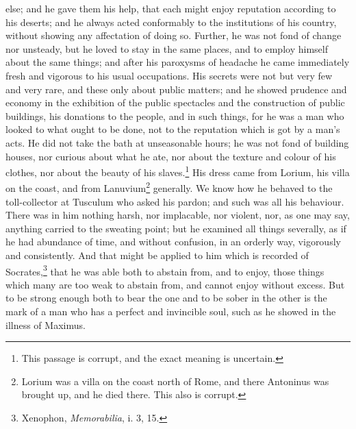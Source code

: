 \begin{enumerate}
else; and he gave them his help, that each might enjoy reputation according to his deserts; and he always acted conformably to the institutions of his country, without showing any affectation of doing so. Further, he was not fond of change nor unsteady, but he loved to stay in the same places, and to employ himself about the same things; and after his paroxysms of headache he came immediately fresh and vigorous to his usual occupations. His secrets were not but very few and very rare, and these only about public matters; and he showed prudence and economy in the exhibition of the public spectacles and the construction of public buildings, his donations to the people, and in such things, for he was a man who looked to what ought to be done, not to the reputation which is got by a man's acts. He did not take the bath at unseasonable hours; he was not fond of building houses, nor curious about what he ate, nor about the texture and colour of his clothes, nor about the beauty of his slaves.\footnote{This passage is corrupt, and the exact meaning is uncertain.} His dress came from Lorium, his villa on the coast, and from Lanuvium\footnote{Lorium was a villa on the coast north of Rome, and there Antoninus was brought up, and he died there. This also is corrupt.} generally. We know how he behaved to the toll-collector at Tusculum who asked his pardon; and such was all his behaviour. There was in him nothing harsh, nor implacable, nor violent, nor, as one may say, anything carried to the sweating point; but he examined all things severally, as if he had abundance of time, and without confusion, in an orderly way, vigorously and consistently. And that might be applied to him which is recorded of Socrates,\footnote{Xenophon, \textit{Memorabilia}, i. 3, 15.} that he was able both to abstain from, and to enjoy, those things which many are too weak to abstain from, and cannot enjoy without excess. But to be strong enough both to bear the one and to be sober in the other is the mark of a man who has a perfect and invincible soul, such as he showed in the illness of Maximus. 


\end{enumerate}
